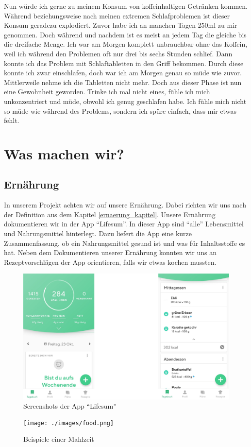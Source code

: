 \newline
Nun würde ich gerne zu meinem Konsum von koffeinhaltigen Getränken kommen. Während beziehungsweise nach meinen extremen Schlafproblemen ist dieser Konsum geradezu explodiert. Zuvor habe ich an manchen Tagen 250ml zu mir genommen. Doch während und nachdem ist es meist an jedem Tag die gleiche bis die dreifache Menge. Ich war am Morgen komplett unbrauchbar ohne das Koffein, weil ich während den Problemen oft nur drei bis sechs Stunden schlief. Dann konnte ich das Problem mit Schlaftabletten in den Griff bekommen. Durch diese konnte ich zwar einschlafen, doch war ich am Morgen genau so müde wie zuvor. Mittlerweile nehme ich die Tabletten nicht mehr. Doch aus dieser Phase ist nun eine Gewohnheit geworden. Trinke ich mal nicht eines, fühle ich mich unkonzentriert und müde, obwohl ich genug geschlafen habe. Ich fühle mich nicht so müde wie während des Problems, sondern ich spüre einfach, dass mir etwas fehlt.
\pagebreak
\section{Was machen wir?}
\subsection{Ernährung}
\authortoc{\dario}{\subsectionident}
In unserem Projekt achten wir auf unsere Ernährung. Dabei richten wir uns nach der Definition aus dem Kapitel \ref{ernaerung_kapitel}.
\newline
Unsere Ernährung dokumentieren wir in der App “Lifesum”. In dieser App sind “alle” Lebensmittel und Nahrungsmittel hinterlegt. Dazu liefert die App eine kurze Zusammenfassung, ob ein Nahrungsmittel gesund ist und was für Inhaltsstoffe es hat. Neben dem Dokumentieren unserer Ernährung konnten wir uns an Rezeptvorschlägen der App orientieren, falls wir etwas kochen mussten.
\newline
\begin{figure}[!ht]
  \centering
  \includegraphics[width=0.7\linewidth]{./images/app.png}
  \caption{Screenshots der App “Lifesum”}
  \label{fig:app_1}
\end{figure}
\newline
\begin{figure}[!ht]
  \centering
  \texttt{[image: ./images/food.png]}
  \caption{Beispiele einer Mahlzeit}
  \label{fig:app_1}
\end{figure}
\newline
